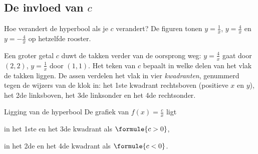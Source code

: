 \begin{oefeningen}
\end{oefeningen}

\subsection{De invloed van $c$}

Hoe verandert de hyperbool als je $c$ verandert? De figuren tonen $y = \tfrac1x$, $y = \tfrac4x$ en $y = -\tfrac4x$ op hetzelfde rooster.


Een groter getal $c$ duwt de takken verder van de oorsprong weg: $y = \tfrac4x$ gaat door $(2, 2)$, $y = \tfrac1x$ door $(1, 1)$. Het teken van $c$ bepaalt in welke delen van het vlak de takken liggen. De assen verdelen het vlak in vier \textit{kwadranten}, genummerd tegen de wijzers van de klok in: het 1ste kwadrant rechtsboven (positieve $x$ en $y$), het 2de linksboven, het 3de linksonder en het 4de rechtsonder.

\begin{theorie}
\begin{stelling}{Ligging van de hyperbool}
De grafiek van $f(x) = \tfrac cx$ ligt

\vspace{1mm}
\qquad in het 1ste en het 3de kwadrant als $\formule{c > 0}$,

\qquad in het 2de en het 4de kwadrant als $\formule{c < 0}$.
\end{stelling}
\end{theorie}

